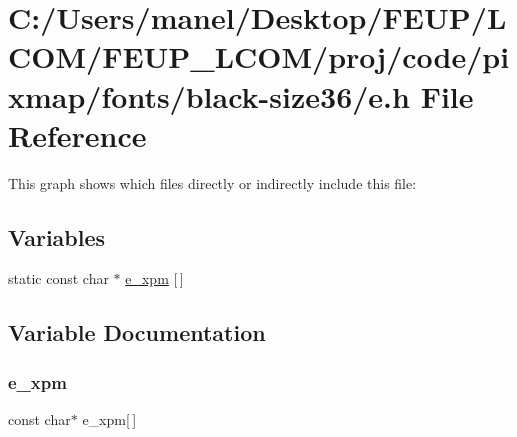\hypertarget{black-size36_2e_8h}{}\section{C\+:/\+Users/manel/\+Desktop/\+F\+E\+U\+P/\+L\+C\+O\+M/\+F\+E\+U\+P\+\_\+\+L\+C\+O\+M/proj/code/pixmap/fonts/black-\/size36/e.h File Reference}
\label{black-size36_2e_8h}
This graph shows which files directly or indirectly include this file\+:
\subsection*{Variables}
\begin{DoxyCompactItemize}
\item 
static const char $\ast$ \mbox{\hyperlink{black-size36_2e_8h_ad3d43c68d5385a9e30faacf483357099}{e\+\_\+xpm}} \mbox{[}$\,$\mbox{]}
\end{DoxyCompactItemize}


\subsection{Variable Documentation}
\mbox{\label{black-size36_2e_8h_ad3d43c68d5385a9e30faacf483357099}} 
\subsubsection{\texorpdfstring{e\_xpm}{e\_xpm}}
{\footnotesize\ttfamily const char$\ast$ e\+\_\+xpm\mbox{[}$\,$\mbox{]}\hspace{0.3cm}{\ttfamily [static]}}

